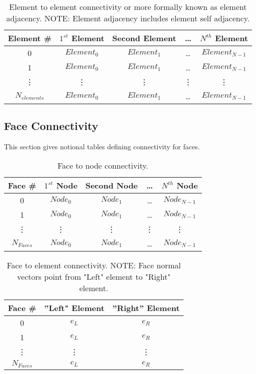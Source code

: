 \documentclass[letterpaper]{article}
\begin{document}
\begin{table}[h!]
\centering
\begin{tabular}{|c|cccc|}
\hline
Element \#  & $1^{st}$ Element  & Second Element & \dots & $N^{th}$ Element \\
\hline
 0 & $Element_{0}$ & $Element_{1}$ & \dots & $Element_{N-1}$ \\
 1 & $Element_{0}$ & $Element_{1}$ & \dots & $Element_{N-1}$ \\
  \vdots & \vdots & \vdots & \vdots & \vdots \\
  $N_{elements}$ & $Element_{0}$ & $Element_{1}$ & \dots & $Element_{N-1}$ \\
\hline 
\end{tabular}
\caption{Element to element connectivity or more formally known as element adjacency.  NOTE: Element adjacency includes element self adjacency. }
\end{table}

\subsection{Face Connectivity}
This section gives notional tables defining connectivity for faces.  
\begin{table}[h!]
\centering
\begin{tabular}{|c|cccc|}
\hline
Face \#  & $1^{st}$ Node  & Second Node & \dots & $N^{th}$ Node \\
\hline
 0 & $Node_{0}$ & $Node_{1}$ & \dots & $Node_{N-1}$ \\
 1 & $Node_{0}$ & $Node_{1}$ & \dots & $Node_{N-1}$ \\
  \vdots & \vdots & \vdots & \vdots & \vdots \\
  $N_{Faces}$ & $Node_{0}$ & $Node_{1}$ & \dots & $Node_{N-1}$ \\
\hline 
\end{tabular}
\caption{Face to node connectivity.}
\end{table}

\begin{table}[h!]
\centering
\begin{tabular}{|c|cc|}
\hline
Face \#  & ''Left" Element  & ''Right'' Element  \\
\hline
 0 & $e_{L}$ & $e_{R}$ \\
 1 & $e_{L}$ & $e_{R}$ \\
 \vdots & \vdots & \vdots \\
 $N_{Faces}$ & $e_{L}$ & $e_{R}$ \\
\hline 
\end{tabular}
\caption{Face to element connectivity.  NOTE: Face normal vectors point from "Left" element to "Right" element.}
\end{table}
\end{document}
